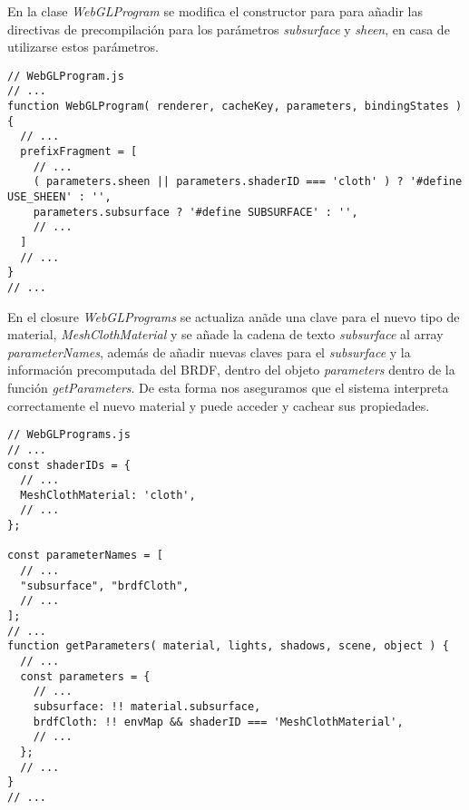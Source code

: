 En la clase \textit{WebGLProgram} se modifica el constructor para para a\~nadir las directivas de precompilaci\'on
para los par\'ametros \textit{subsurface} y \textit{sheen}, en casa de utilizarse estos par\'ametros.\\

\begin{lstlisting}[caption=Cambios sobre la clase WebGLProgram de ThreeJs]
// WebGLProgram.js
// ...
function WebGLProgram( renderer, cacheKey, parameters, bindingStates ) {
  // ...
  prefixFragment = [
    // ...
    ( parameters.sheen || parameters.shaderID === 'cloth' ) ? '#define USE_SHEEN' : '',
    parameters.subsurface ? '#define SUBSURFACE' : '',
    // ...
  ]
  // ...
}
// ...
\end{lstlisting}
\singlespacing

En el closure \textit{WebGLPrograms} se actualiza an\~ade una clave para el nuevo tipo de material, \textit{MeshClothMaterial}
y se a\~nade la cadena de texto \textit{subsurface} al array \textit{parameterNames}, adem\'as de a\~nadir nuevas claves para
el \textit{subsurface} y la informaci\'on precomputada del BRDF, dentro del objeto \textit{parameters} dentro de la funci\'on
\textit{getParameters}. De esta forma nos aseguramos que el sistema interpreta correctamente el nuevo material y puede acceder
y cachear sus propiedades.

\singlespacing
\begin{lstlisting}[caption=Cambios sobre la clase WebGLPrograms de ThreeJs]
// WebGLPrograms.js
// ...
const shaderIDs = {
  // ...
  MeshClothMaterial: 'cloth',
  // ...
};

const parameterNames = [
  // ...
  "subsurface", "brdfCloth",
  // ...
];
// ...
function getParameters( material, lights, shadows, scene, object ) {
  // ...
  const parameters = {
    // ...
    subsurface: !! material.subsurface,
    brdfCloth: !! envMap && shaderID === 'MeshClothMaterial',
    // ...
  };
  // ...
}
// ...
\end{lstlisting}



